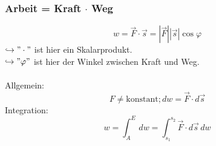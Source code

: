 \documentclass[a4paper]{article}
\begin{document}
\subsubsection{Arbeit = Kraft $\cdot$ Weg}
\begin{equation*}
    w = \vec{F} \cdot \vec{s} = \left\lvert \vec{F} \right\rvert \left\lvert \vec{s} \right\rvert \cos \varphi
\end{equation*}
$\hookrightarrow "\cdot"$ ist hier ein Skalarprodukt.\\
$\hookrightarrow "\varphi"$ ist hier der Winkel zwischen Kraft und Weg.\\\\
Allgemein:
\begin{equation*}
    F \neq \mathrm{konstant}; dw = \vec{F} \cdot d\vec{s}
\end{equation*}
Integration:
\begin{equation*}
    w = \int_{A}^{E}  \,dw = \int_{s_1}^{s_2}  \vec{F}\cdot d\vec{s}\,dw
\end{equation*}
\end{document}
